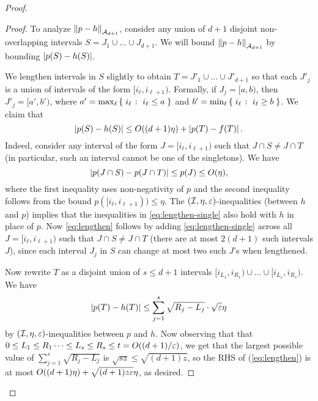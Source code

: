 \begin{proof}
\begin{proof}
To analyze
$\lVert p-h{\rVert}_{\mathcal A_{d+1}}$,
consider any union of ${d+1}$ 
disjoint non-overlapping intervals $S = J_1 \cup\dots \cup J_{d+1}$.
We will bound $\lVert p - h {\rVert}_{\mathcal A_{d+1}}$ 
by bounding $\left\lvert  p(S) - h(S) \right\rvert$.

We lengthen intervals in $S$ slightly to obtain $T = J'_1 \cup \dots \cup J'_{{d+1}}$ 
so that each $J'_j$ is a union of intervals of the form $[i_\ell,i_{\ell+1})$.
Formally, if $J_j = [a,b)$, then $J'_j = [a',b')$, where $a' = \max_\ell \left\{\;  i_\ell  \;\colon\;  i_\ell \leq a \; \right\}$ and $b' = \min_\ell \left\{\;  i_\ell  \;\colon\;  i_\ell \geq b \; \right\}$.
We claim that
\begin{equation} \label{eq:lengthen}
  \left\lvert  p(S) - h(S)  \right\rvert \leq O({(d+1)}\eta) + \left\lvert  p(T) - f(T)  \right\rvert .
\end{equation}
Indeed, consider any interval of the form $J = [i_\ell, i_{\ell+1})$ 
such that $J \cap S \neq J \cap T$ (in particular, such an interval cannot be one of the singletons).  We have
\begin{equation} \label{eq:lengthen-single}
\left\lvert  p(J \cap S) - p(J \cap T)  \right\rvert \leq p(J) \leq {O(\eta)},
\end{equation}
where the first inequality uses non-negativity of $p$ 
and the second inequality follows from the bound
$p([i_\ell,i_{\ell + 1})) \leq \eta$.
The {$(\mathcal{I}, \eta, \varepsilon)$-inequalities 
(between $h$ and $p$)}
implies that the inequalities in 
\eqref{eq:lengthen-single} also hold with $h$ in place of $p$.
Now \eqref{eq:lengthen} follows by 
adding \eqref{eq:lengthen-single} across all
$J = [i_\ell, i_{\ell+1})$ such that $J\cap S\neq J\cap T$
(there are at most $2{(d+1)}$ such intervals $J$), 
since each interval $J_j$ in $S$ can change at most two such
$J$'s when lengthened.

Now rewrite $T$ as a 
disjoint union of $s \leq {d+1}$ intervals
$[i_{L_1}, i_{R_1}) \cup \dots \cup [i_{L_s}, i_{R_s})$.
We have
\[ \left\lvert  p(T) - h(T)  \right\rvert \leq \sum_{j=1}^s \sqrt{R_j - L_j} \cdot \sqrt
{\varepsilon}\eta \]
by {$(\mathcal{I}, \eta, \varepsilon)$-inequalities between $p$ and $h$}.
Now observing that 
that $0 \leq L_1 \leq R_1 \cdots \leq L_s \leq R_s \leq t =
O((d+1)/\varepsilon)$, we get that the largest possible value of $\sum_{j=1}^s
\sqrt{R_j - L_j}$ is $\sqrt{sz} \leq {\sqrt{{(d+1)}z}}$, 
so the RHS of
(\ref{eq:lengthen}) is at most $O({(d+1)}\eta) + {\sqrt{
{(d+1)}z\varepsilon}\eta}$, as
desired.
\end{proof}


\end{proof}

